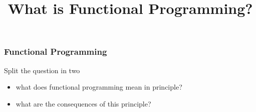 {


  \begin{frame}[plain] 
  \title{What is Functional Programming?}
  
  \vspace{3em}

  \begin{TitleBoxWhatDoesFunctionalProgrammingMean}
    \begin{center}
    {\Large \inserttitle}
    \end{center}
  \end{TitleBoxWhatDoesFunctionalProgrammingMean}

  \end{frame}
}


\begin{frame}
\frametitle{Functional Programming}
\begin{block}{Split the question in two}
\begin{itemize}
\item what does functional programming mean in principle?
\item what are the consequences of this principle?
\end{itemize}
\end{block}
\end{frame}


